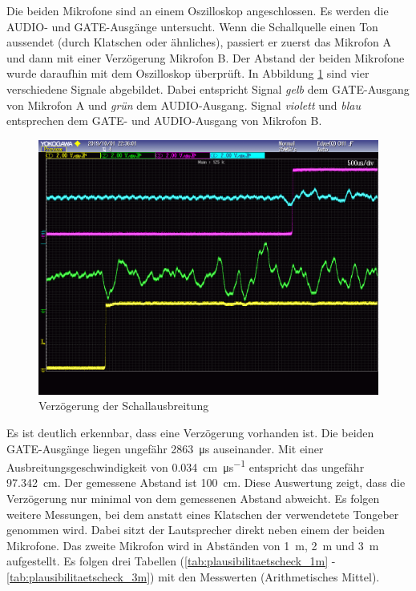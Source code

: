 Die beiden Mikrofone sind an einem Oszilloskop angeschlossen. Es werden die \si{AUDIO}- und \si{GATE}-Ausgänge untersucht. Wenn die Schallquelle einen Ton aussendet (durch Klatschen oder ähnliches), passiert er zuerst das Mikrofon A und dann mit einer Verzögerung Mikrofon B. Der Abstand der beiden Mikrofone wurde daraufhin mit dem Oszilloskop überprüft. In Abbildung \ref{img:plausibilitaetscheck_oszi} sind vier verschiedene Signale abgebildet. Dabei entspricht Signal \textit{gelb} dem \si{GATE}-Ausgang von Mikrofon A und \textit{grün} dem \si{AUDIO}-Ausgang. Signal \textit{violett} und \textit{blau} entsprechen dem \si{GATE}- und \si{AUDIO}-Ausgang von Mikrofon B.

\begin{figure}[H]
        \centering
        \hspace*{-1.9cm}
        \includegraphics[width=1.2\textwidth]{images/plausibilitaetscheck_oszi.png}
        \caption{Verzögerung der Schallausbreitung}
        \label{img:plausibilitaetscheck_oszi}
\end{figure}

Es ist deutlich erkennbar, dass eine Verzögerung vorhanden ist. Die beiden \si{GATE}-Ausgänge liegen ungefähr \SI{2863}{\micro \second} auseinander. Mit einer Ausbreitungsgeschwindigkeit von \SI{0,034}{\centi\metre\per\micro\second} entspricht das ungefähr \SI{97,342}{\centi\metre}. Der gemessene Abstand ist \SI{100}{\centi\metre}. Diese Auswertung zeigt, dass die Verzögerung nur minimal von dem gemessenen Abstand abweicht. Es folgen weitere Messungen, bei dem anstatt eines Klatschen der verwendetete Tongeber genommen wird. Dabei sitzt der Lautsprecher direkt neben einem der beiden Mikrofone. Das zweite Mikrofon wird in Abständen von \SI{1}{\metre}, \SI{2}{\metre} und \SI{3}{\metre} aufgestellt. Es folgen drei Tabellen (\ref{tab:plausibilitaetscheck_1m} - \ref{tab:plausibilitaetscheck_3m}) mit den Messwerten (Arithmetisches Mittel).


